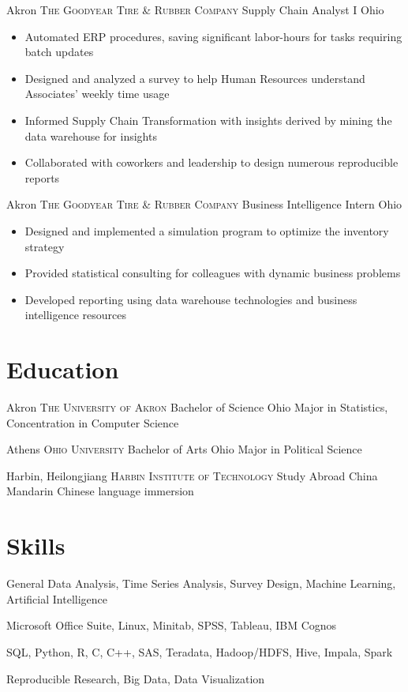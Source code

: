 \documentclass[letterpaper,12pt,color,final]{moderncv}
\begin{document}
{Akron}
{\textsc{The Goodyear Tire \& Rubber Company}}
{Supply Chain Analyst I}
{Ohio}
{\begin{itemize}
  \item Automated ERP procedures, saving significant labor-hours for tasks requiring batch updates
  \item Designed and analyzed a survey to help Human Resources understand Associates' weekly time usage
  \item Informed Supply Chain Transformation with insights derived by mining the data warehouse for insights
  \item Collaborated with coworkers and leadership to design numerous reproducible reports
 \end{itemize}}

{Akron}
{\textsc{The Goodyear Tire \& Rubber Company}}
{Business Intelligence Intern}
{Ohio}
{\begin{itemize}
  \item Designed and implemented a simulation program to optimize the inventory strategy
  \item Provided statistical consulting for colleagues with dynamic business problems
  \item Developed reporting using data warehouse technologies and business intelligence resources
 \end{itemize}}

\section{Education}

{Akron}
{\textsc{The University of Akron}}
{Bachelor of Science}
{Ohio}
{Major in Statistics, Concentration in Computer Science}

{Athens}
{\textsc{Ohio University}}
{Bachelor of Arts}
{Ohio}
{Major in Political Science}

{Harbin, Heilongjiang}
{\textsc{Harbin Institute of Technology}}
{Study Abroad}
{China}
{Mandarin Chinese language immersion}

\section{Skills}

{\newline{}
 General Data Analysis, Time Series Analysis, Survey Design, Machine Learning, Artificial Intelligence}

{\newline{}
 Microsoft Office Suite, Linux, Minitab, SPSS, Tableau, IBM Cognos}

{\newline{}
 SQL, Python, R, C, C++, SAS, Teradata, Hadoop/HDFS, Hive, Impala, Spark}

{\newline{}
 Reproducible Research, Big Data, Data Visualization}
\end{document}
